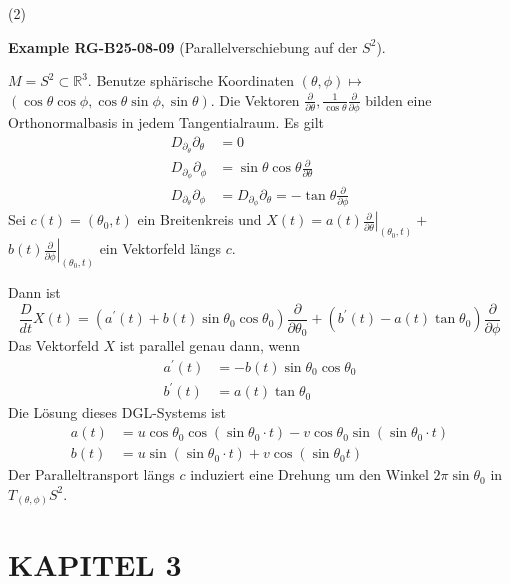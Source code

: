 \documentclass[10pt, letterpaper]{article}
\newcommand{\CustomHeading}[3]{%
  \par\medskip\noindent%
  \textbf{#1 #2} \textnormal{(#3)}.\enskip%
}
\newenvironment{EXA}[2]{\begin{unitbox}\CustomHeading{Example}{#1}{#2}}{\end{unitbox}}
\begin{document}
(2) 

\begin{EXA}{RG-B25-08-09}{Parallelverschiebung auf der $S^2$}
$M=S^{2} \subset \mathbb{R}^{3}$. Benutze sphärische Koordinaten $(\theta, \phi) \mapsto$ $(\cos \theta \cos \phi, \cos \theta \sin \phi, \sin \theta)$. Die Vektoren $\frac{\partial}{\partial \theta}, \frac{1}{\cos \theta} \frac{\partial}{\partial \phi}$ bilden eine Orthonormalbasis in jedem Tangentialraum. Es gilt
$$
\begin{aligned}
D_{\partial_{\theta}} \partial_{\theta} & =0 \\
D_{\partial_{\phi}} \partial_{\phi} & =\sin \theta \cos \theta \frac{\partial}{\partial \theta} \\
D_{\partial_{\theta}} \partial_{\phi} & =D_{\partial_{\phi}} \partial_{\theta}=-\tan \theta \frac{\partial}{\partial \phi}
\end{aligned}
$$
Sei $c(t)=\left(\theta_{0}, t\right)$ ein Breitenkreis und $X(t)=\left.a(t) \frac{\partial}{\partial \theta}\right|_{\left(\theta_{0}, t\right)}+$ $\left.b(t) \frac{\partial}{\partial \phi}\right|_{\left(\theta_{0}, t\right)}$ ein Vektorfeld längs $c$.

Dann ist
$$
\frac{D}{d t} X(t)=\left(a^{\prime}(t)+b(t) \sin \theta_{0} \cos \theta_{0}\right) \frac{\partial}{\partial \theta_{0}}+\left(b^{\prime}(t)-a(t) \tan \theta_{0}\right) \frac{\partial}{\partial \phi}
$$
Das Vektorfeld $X$ ist parallel genau dann, wenn
$$
\begin{aligned}
a^{\prime}(t) & =-b(t) \sin \theta_{0} \cos \theta_{0} \\
b^{\prime}(t) & =a(t) \tan \theta_{0}
\end{aligned}
$$
Die Lösung dieses DGL-Systems ist
$$
\begin{aligned}
a(t) & =u \cos \theta_{0} \cos \left(\sin \theta_{0} \cdot t\right)-v \cos \theta_{0} \sin \left(\sin \theta_{0} \cdot t\right) \\
b(t) & =u \sin \left(\sin \theta_{0} \cdot t\right)+v \cos \left(\sin \theta_{0} t\right)
\end{aligned}
$$
Der Paralleltransport längs $c$ induziert eine Drehung um den Winkel $2 \pi \sin \theta_{0}$ in $T_{(\theta, \phi)} S^{2}$.
\end{EXA}


\pagebreak



\section*{KAPITEL 3}
\end{document}
